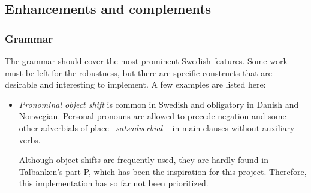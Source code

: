 \documentclass{report}
\begin{document}
\subsection{Enhancements and complements}
\subsubsection{Grammar}
The grammar should cover the most prominent Swedish features.
Some work must be left for the robustness, but there are specific constructs
that are desirable and interesting to implement. A few examples are listed here:\\

\begin{itemize}
\item
\textit{Pronominal object shift} is common in Swedish and obligatory in Danish and Norwegian.
Personal pronouns are allowed to precede negation and some other adverbials of place --\textit{satsadverbial} --
in main clauses without auxiliary verbs.


Although object shifts are frequently used, they are hardly found in
Talbanken's part P, which has been the inspiration for this project.
Therefore, this implementation has so far not been prioritized.\\




\end{itemize}
\end{document}
